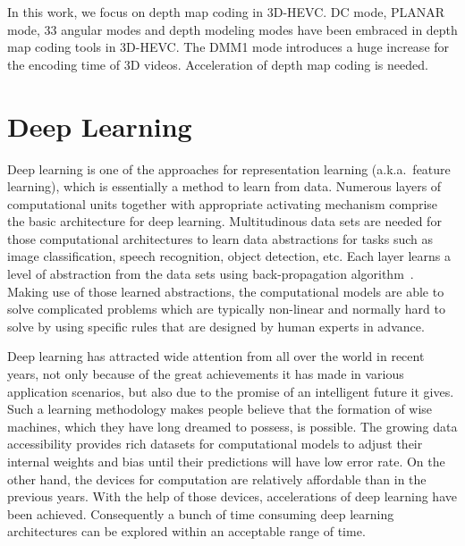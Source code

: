 In this work, we focus on depth map coding in 3D-HEVC\@.
DC mode, PLANAR mode, 33 angular modes and depth modeling modes 
have been embraced in
depth map coding tools in 3D-HEVC\@.
The DMM1 mode introduces a huge increase for the encoding time of 3D videos.
Acceleration of depth map coding is needed.

\section{Deep Learning}\label{sec:deep-learning}
Deep learning is one of the approaches for representation learning
(a.k.a.\ feature learning), which is essentially a method to
learn from data.
Numerous layers of computational units together with appropriate activating
mechanism comprise the basic architecture for deep learning.
Multitudinous data sets are needed for those computational architectures
to learn data abstractions
for tasks such as image classification, speech recognition,
object detection, etc.
Each layer learns a level of abstraction from the data sets using
back-propagation algorithm~\parencite{RN96}.
Making use of those learned abstractions, the computational models are
able to solve complicated problems which are typically non-linear and normally hard
to solve by using specific rules that are designed by human experts in advance.

Deep learning has attracted wide attention from all over the world
in recent years, not only because of the great achievements it has
made in various application scenarios, but also due to the promise of an
intelligent future it gives.
Such a learning methodology makes people believe that 
the formation of wise machines, which they have long
dreamed to possess, is possible.
The growing data accessibility provides rich datasets for computational
models to adjust their internal weights and bias until their
predictions will have low error rate.
On the other hand, the devices for computation are relatively
affordable than in the previous years. 
With the help of those devices,
accelerations of deep learning have been achieved.
Consequently a bunch of time consuming deep learning architectures 
can be explored within an acceptable range of time.

